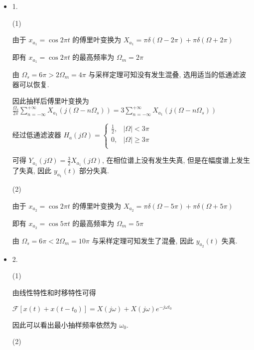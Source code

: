 \documentclass[a4paper,UTF8]{article}
\numberwithin{equation}{section}
\begin{document}
	\begin{framed}
		\begin{spacing}{1.5}
			\begin{itemize}
        \item 1.

        (1)
        
        由于 $x_{a_1} = \cos 2\pi t$ 的傅里叶变换为 $X_{a_1} = \pi \delta(\Omega - 2\pi) + \pi \delta(\Omega + 2\pi)$
        
        即有 $x_{a_1} = \cos 2\pi t$ 的最高频率为 $\Omega_m = 2\pi$
        
        由 $\Omega_s = 6\pi > 2 \Omega_m = 4\pi$ 与采样定理可知没有发生混叠, 选用适当的低通滤波器可以恢复.
        
        因此抽样后傅里叶变换为 $\displaystyle \frac{\Omega_s}{2\pi}\sum_{n=-\infty}^{+\infty}X_{a_1}(j(\Omega-n \Omega_s)) = 3\sum_{n=-\infty}^{+\infty}X_{a_1}(j(\Omega-n \Omega_s))$
        
        经过低通滤波器 $\displaystyle H_a(j\Omega) = \begin{cases}
            \frac{1}{2}, & |\Omega| < 3\pi \\
            0, & |\Omega| \ge 3\pi \\
        \end{cases}$
        
        可得 $\displaystyle Y_{a_1}(j\Omega) = \frac{3}{2}X_{a_1}(j\Omega)$, 在相位谱上没有发生失真, 但是在幅度谱上发生了失真, 因此 $y_{a_1}(t)$ 部分失真.
        
        (2)
        
        由于 $x_{a_2} = \cos 2\pi t$ 的傅里叶变换为 $X_{a_2} = \pi \delta(\Omega - 5\pi) + \pi \delta(\Omega + 5\pi)$
        
        即有 $x_{a_2} = \cos 5\pi t$ 的最高频率为 $\Omega_m = 5\pi$
        
        由 $\Omega_s = 6\pi < 2 \Omega_m = 10\pi$ 与采样定理可知发生了混叠, 因此 $y_{a_2}(t)$ 失真.
        
        \item 2.
        
        (1)
        
        由线性特性和时移特性可得
        
        $\displaystyle \mathcal{F}[x(t) + x(t-t_0)] = X(j\omega) + X(j\omega)e^{-j\omega t_0}$
        
        因此可以看出最小抽样频率依然为 $\omega_0$.
        
        (2)
        

\end{itemize}
\end{spacing}
\end{framed}
\end{document}
